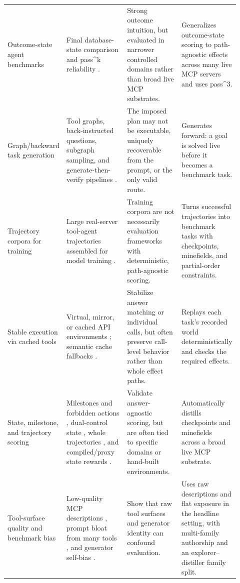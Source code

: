 \begin{table}[t]
\begin{tabular}{p{0.18\linewidth}p{0.28\linewidth}p{0.25\linewidth}p{0.21\linewidth}}
Outcome-state agent benchmarks &
Final database-state comparison and pass\textasciicircum{}k reliability
\citep{yao2024tau}. &
Strong outcome intuition, but evaluated in narrower controlled domains rather
than broad live MCP substrates. &
Generalizes outcome-state scoring to path-agnostic effects across many live
MCP servers and uses pass\textasciicircum{}3. \\

Graph/backward task generation &
Tool graphs, back-instructed questions, subgraph sampling, and
generate-then-verify pipelines
\citep{shen2024taskbench, guo2026unitoolbench, liu2025mcpeval,
shi2025taskcraft}. &
The imposed plan may not be executable, uniquely recoverable from the prompt,
or the only valid route. &
Generates forward: a goal is solved live before it becomes a benchmark task. \\

Trajectory corpora for training &
Large real-server tool-agent trajectories assembled for model training
\citep{xu2025toucan}. &
Training corpora are not necessarily evaluation frameworks with deterministic,
path-agnostic scoring. &
Turns successful trajectories into benchmark tasks with checkpoints,
minefields, and partial-order constraints. \\

Stable execution via cached tools &
Virtual, mirror, or cached API environments
\citep{guo2024stabletoolbench, guo2025stabletoolbench}; semantic cache
fallbacks \citep{cheng2025travelbench}. &
Stabilize answer matching or individual calls, but often preserve call-level
behavior rather than whole effect paths. &
Replays each task's recorded world deterministically and checks the required
effects. \\

State, milestone, and trajectory scoring &
Milestones and forbidden actions \citep{lu2025toolsandbox}, dual-control
state \citep{barres2025tau}, whole trajectories \citep{kim2025beyond}, and
compiled/proxy state rewards \citep{zeng2026logigen, chuang2026toward}. &
Validate answer-agnostic scoring, but are often tied to specific domains or
hand-built environments. &
Automatically distills checkpoints and minefields across a broad live MCP
substrate. \\

Tool-surface quality and benchmark bias &
Low-quality MCP descriptions \citep{hasan2026model, wang2026docs}, prompt
bloat from many tools \citep{gan2025rag}, and generator self-bias
\citep{yuan2026silencer}. &
Show that raw tool surfaces and generator identity can confound evaluation. &
Uses raw descriptions and flat exposure in the headline setting, with
multi-family authorship and an explorer--distiller family split. \\

\bottomrule
\end{tabular}
\end{table}

